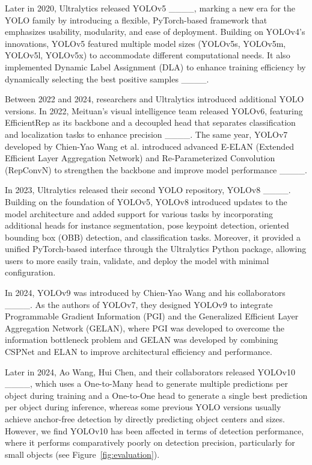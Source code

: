 Later in 2020, Ultralytics released YOLOv5 ____, marking a new era for the YOLO family by introducing a flexible, PyTorch-based framework that emphasizes usability, modularity, and ease of deployment. Building on YOLOv4’s innovations, YOLOv5 featured multiple model sizes (YOLOv5s, YOLOv5m, YOLOv5l, YOLOv5x) to accommodate different computational needs. It also implemented Dynamic Label Assignment (DLA) to enhance training efficiency by dynamically selecting the best positive samples ____.

Between 2022 and 2024, researchers and Ultralytics introduced additional YOLO versions. In 2022, Meituan’s visual intelligence team released YOLOv6, featuring EfficientRep as its backbone and a decoupled head that separates classification and localization tasks to enhance precision ____. The same year, YOLOv7 developed by Chien-Yao Wang et al. introduced advanced E-ELAN (Extended Efficient Layer Aggregation Network) and Re-Parameterized Convolution (RepConvN) to strengthen the backbone and improve model performance ____.

In 2023, Ultralytics released their second YOLO repository, YOLOv8 ____. Building on the foundation of YOLOv5, YOLOv8 introduced updates to the model architecture and added support for various tasks by incorporating additional heads for instance segmentation, pose keypoint detection, oriented bounding box (OBB) detection, and classification tasks. Moreover, it provided a unified PyTorch-based interface through the Ultralytics Python package, allowing users to more easily train, validate, and deploy the model with minimal configuration.

In 2024, YOLOv9 was introduced by Chien-Yao Wang and his collaborators ____. As the authors of YOLOv7, they designed YOLOv9 to integrate Programmable Gradient Information (PGI) and the Generalized Efficient Layer Aggregation Network (GELAN), where PGI was developed to overcome the information bottleneck problem and GELAN was developed by combining CSPNet and ELAN to improve architectural efficiency and performance.

Later in 2024, Ao Wang, Hui Chen, and their collaborators released YOLOv10 ____, which uses a One-to-Many head to generate multiple predictions per object during training and a One-to-One head to generate a single best prediction per object during inference, whereas some previous YOLO versions usually achieve anchor-free detection by directly predicting object centers and sizes. However, we find YOLOv10 has been affected in terms of detection performance, where it performs comparatively poorly on detection precision, particularly for small objects (see Figure~\ref{fig:evaluation}).

